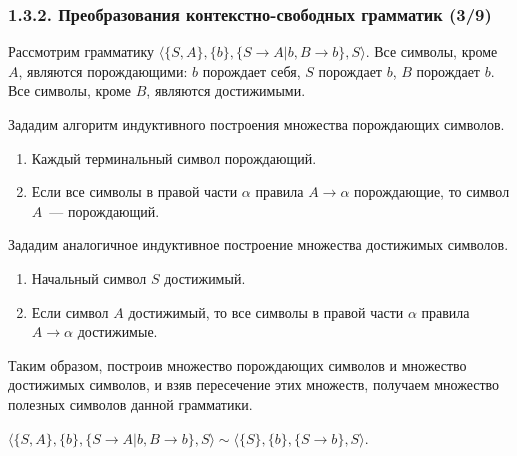 \begin{frame}
\frametitle{1.3.2. Преобразования контекстно-свободных грамматик (3/9)}

\begin{example}
Рассмотрим грамматику 
$\langle\{S,A\}, \{b\}, \{S \rightarrow A|b,  B \rightarrow b\},S\rangle$.
Все символы, кроме $A$, являются порождающими: $b$ порождает себя, $S$ порождает $b$, $B$ порождает $b$.
Все символы, кроме $B$, являются достижимыми.
\end{example}

\smallskip
Зададим алгоритм индуктивного построения множества порождающих символов.
\begin{enumerate}
\item Каждый терминальный символ порождающий.
\item Если все символы в правой части $\alpha$ правила 
 $A\rightarrow \alpha$ порождающие, то символ $A$~--- порождающий.
\end{enumerate}

\smallskip
Зададим аналогичное индуктивное построение множества достижимых символов.
\begin{enumerate}
\item Начальный символ $S$ достижимый.
\item Если символ $A$ достижимый, то все символы в правой части $\alpha$ правила 
 $A\rightarrow \alpha$ достижимые.
\end{enumerate}

Таким образом, построив множество порождающих символов и
множество достижимых символов, и взяв пересечение этих множеств, получаем множество полезных символов данной грамматики. 
\begin{example}
$\langle\{S,A\}, \{b\}, \{S \rightarrow A|b,  B \rightarrow b\},S\rangle
\sim \langle\{S\}, \{b\}, \{S \rightarrow b\},S\rangle$.
\end{example}

\end{frame}


